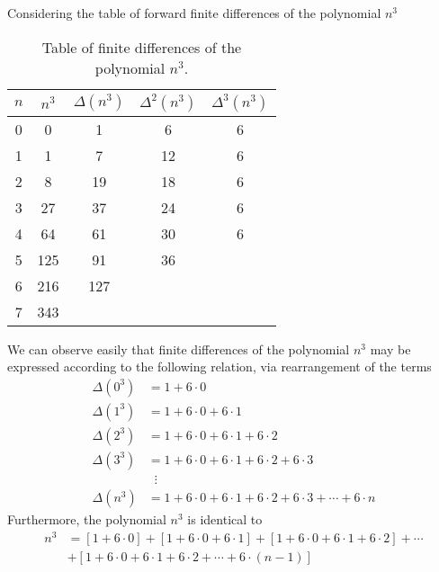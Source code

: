 Considering the table of forward finite differences of the polynomial $n^3$
\begin{table}[H]
    \begin{center}
        \setlength\extrarowheight{-6pt}
        \begin{tabular}{c|cccc}
            $n$ & $n^3$ & $\Delta(n^3)$ & $\Delta^2(n^3)$ & $\Delta^3(n^3)$ \\
            \hline
            0   & 0     & 1             & 6               & 6               \\
            1   & 1     & 7             & 12              & 6               \\
            2   & 8     & 19            & 18              & 6               \\
            3   & 27    & 37            & 24              & 6               \\
            4   & 64    & 61            & 30              & 6               \\
            5   & 125   & 91            & 36              &                 \\
            6   & 216   & 127           &                 &                 \\
            7   & 343   &               &                 &
        \end{tabular}
    \end{center}
    \caption{Table of finite differences of the polynomial $n^3$.} \label{tab:table}
\end{table}
We can observe easily that finite differences of the polynomial $n^3$ may be expressed according
to the following relation, via rearrangement of the terms
\begin{align*}
    \Delta(0^3) &= 1+6 \cdot 0 \\
    \Delta(1^3) &= 1+6\cdot0+6\cdot1 \\
    \Delta(2^3) &= 1+6\cdot0+6\cdot1+6\cdot2 \\
    \Delta(3^3) &= 1+6\cdot0+6\cdot1+6\cdot2+6\cdot3 \\
    &\; \; \vdots \\
    \Delta(n^3) &= 1+6\cdot0+6\cdot1+6\cdot2+6\cdot3+\cdots+6\cdot n
\end{align*}
Furthermore, the polynomial $n^3$ is identical to
\begin{align*}
    n^3 &= [1+6\cdot0]+[1+6\cdot0+6\cdot1]+[1+6\cdot0+6\cdot1+6\cdot2]+\cdots \\
    &+[1+6\cdot0+6\cdot1+6\cdot2+\cdots+6\cdot(n-1)]
\end{align*}
